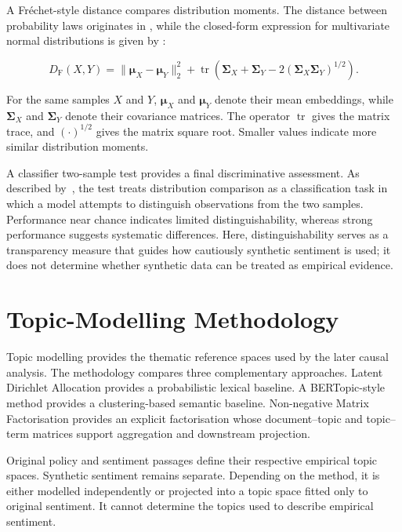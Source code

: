 A Fr\'echet-style distance compares distribution moments. The distance between
probability laws originates in \cite{frechet1957distance}, while the closed-form
expression for multivariate normal distributions is given by
\cite{dowson1982frechet}:

\begin{equation}
D_{\mathrm{F}}(X,Y)
=
\lVert\boldsymbol{\mu}_X-\boldsymbol{\mu}_Y\rVert_2^2
+
\operatorname{tr}\!\left(
\boldsymbol{\Sigma}_X+\boldsymbol{\Sigma}_Y
-2(\boldsymbol{\Sigma}_X\boldsymbol{\Sigma}_Y)^{1/2}
\right).
\label{eq:method-frechet}
\end{equation}

For the same samples $X$ and $Y$, $\boldsymbol{\mu}_X$ and
$\boldsymbol{\mu}_Y$ denote their mean embeddings, while
$\boldsymbol{\Sigma}_X$ and $\boldsymbol{\Sigma}_Y$ denote their covariance matrices.
The operator $\operatorname{tr}$ gives the matrix trace, and $(\cdot)^{1/2}$ gives
the matrix square root. Smaller values indicate more similar distribution moments.

A classifier two-sample test provides a final discriminative assessment. As described
by~\cite{lopez2016revisiting}, the test treats distribution comparison as a
classification task in which a model attempts to distinguish observations from the
two samples. Performance near chance indicates limited distinguishability, whereas
strong performance suggests systematic differences. Here, distinguishability serves
as a transparency measure that guides how cautiously synthetic sentiment is used; it
does not determine whether synthetic data can be treated as empirical evidence.

\section{Topic-Modelling Methodology}
\label{sec:method-topic-modelling}

Topic modelling provides the thematic reference spaces used by the later causal
analysis. The methodology compares three complementary approaches. Latent Dirichlet
Allocation provides a probabilistic lexical baseline. A BERTopic-style method
provides a clustering-based semantic baseline. Non-negative Matrix Factorisation
provides an explicit factorisation whose document--topic and topic--term matrices
support aggregation and downstream projection.

Original policy and sentiment passages define their respective empirical topic
spaces. Synthetic sentiment remains separate. Depending on the method, it is either
modelled independently or projected into a topic space fitted only to original
sentiment. It cannot determine the topics used to describe empirical sentiment.


